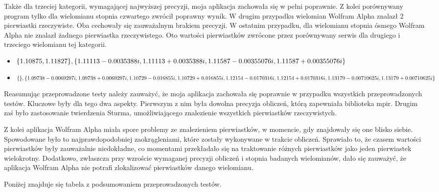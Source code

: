 Także dla trzeciej kategorii, wymagającej najwyższej precyzji, moja aplikacja zachowała się w pełni poprawnie. Z kolei porównywany program tylko dla wielomianu stopnia czwartego zwrócił poprawny wynik. W drugim przypadku wielomian Wolfram Alpha znalazł 2 pierwiastki rzeczywiste. Oba cechowały się zauważalnym brakiem precyzji. W ostatnim przypadku, dla wielomianu stopnia ósmego Wolfram Alpha nie znalazł żadnego pierwiastka rzeczywistego. Oto wartości pierwiastków zwrócone przez porównywany serwis dla drugiego i trzeciego wielomianu tej kategorii.

\begin{itemize}
	\item $\{1.10875, 1.11827\}, \{1.11113-0.0035388i,1.11113+0.0035388i, \\
	1.11587-0.00355076i, 1.11587+0.00355076i\}$
	\item $\{\}, \{1.09738-0.0069297i,1.09738+0.0069297i, 1.10729-0.016855i, \\
	1.10729+0.016855i, 1.12154-0.0170316i, 1.12154+0.0170316i, 1.13179-0.00710625i, \\ 1.13179+0.00710625i\}$
\end{itemize}	

Reasumując przeprowadzone testy należy zauważyć, że moja aplikacja zachowała się poprawnie w przypadku wszystkich przeprowadzonych testów. Kluczowe były dla tego dwa aspekty. Pierwszym z nim była dowolna precyzja obliczeń, którą zapewniała biblioteka mpir. Drugim zaś było zastosowanie twierdzenia Sturma, umożliwiającego znalezienie wszystkich pierwiastków rzeczywistych.

Z kolei aplikacja Wolfram Alpha miała spore problemy ze znalezieniem pierwiastków, w momencie, gdy znajdowały się one blisko siebie. Spowodowane było to najprawdopodobniej zaokrągleniami, które zostały wykonywane w trakcie obliczeń. Sprawiało to, że czasem wartości pierwiastków były zauważalnie niedokładne, co momentami przekładało się na traktowanie różnych pierwiastków jako jeden pierwiastek wielokrotny. Dodatkowo, zwłaszcza przy wzroście wymaganej precyzji obliczeń i stopnia badanych wielomianów, dało się zauważyć, że aplikacja Wolfram Alpha nie potrafi zlokalizować pierwiastków danego wielomianu.

Poniżej znajduje się tabela z podsumowaniem przeprowadzonych testów.

